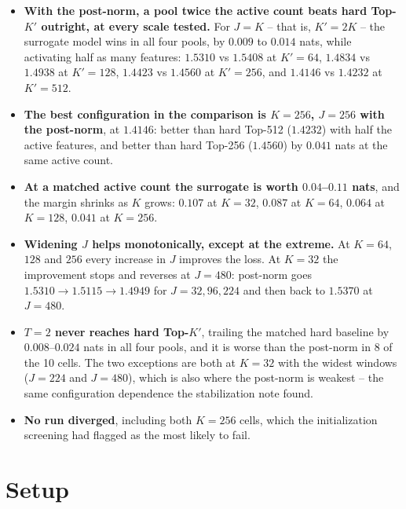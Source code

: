 \documentclass[11pt,a4paper]{article}
\newcommand{\Kp}{K'}
\begin{document}
\begin{itemize}[leftmargin=1.4em]
\item \textbf{With the post-norm, a pool twice the active count beats hard
Top-$\Kp$ outright, at every scale tested.} For $J=K$ -- that is,
$\Kp = 2K$ -- the surrogate model wins in all four pools, by $0.009$ to
$0.014$ nats, while activating half as many features:
$1.5310$ vs $1.5408$ at $\Kp{=}64$, $1.4834$ vs $1.4938$ at $\Kp{=}128$,
$1.4423$ vs $1.4560$ at $\Kp{=}256$, and $1.4146$ vs $1.4232$ at
$\Kp{=}512$.

\item \textbf{The best configuration in the comparison is $K=256$, $J=256$
with the post-norm}, at $1.4146$: better than hard Top-512 ($1.4232$) with
half the active features, and better than hard Top-256 ($1.4560$) by
$0.041$ nats at the same active count.

\item \textbf{At a matched active count the surrogate is worth $0.04$--$0.11$
nats}, and the margin shrinks as $K$ grows: $0.107$ at $K=32$, $0.087$ at
$K=64$, $0.064$ at $K=128$, $0.041$ at $K=256$.

\item \textbf{Widening $J$ helps monotonically, except at the extreme.} At
$K=64$, $128$ and $256$ every increase in $J$ improves the loss. At $K=32$
the improvement stops and reverses at $J=480$: post-norm goes $1.5310 \to
1.5115 \to 1.4949$ for $J=32,96,224$ and then back to $1.5370$ at $J=480$.

\item \textbf{$T=2$ never reaches hard Top-$\Kp$}, trailing the matched hard
baseline by $0.008$--$0.024$ nats in all four pools, and it is worse than the
post-norm in 8 of the 10 cells. The two exceptions are both at $K=32$ with
the widest windows ($J=224$ and $J=480$), which is also where the post-norm
is weakest -- the same configuration dependence the stabilization note
found.

\item \textbf{No run diverged}, including both $K=256$ cells, which the
initialization screening had flagged as the most likely to fail.
\end{itemize}

\section{Setup}
\end{document}
